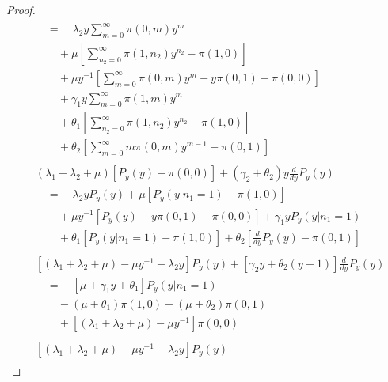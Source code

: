 \begin{proof}
\begin{align}
\begin{split}
            & \quad = \quad \lambda_2 y \sum_{m=0}^{\infty} \pi(0, m) y^{m} \\
            & \quad \quad + \mu \left[ \sum_{n_2=0}^{\infty} \pi(1, n_2) y^{n_2} - \pi(1, 0) \right] \\
            & \quad \quad + \mu y^{-1} \left[ \sum_{m=0}^{\infty} \pi(0, m) y^{m} - y \pi(0, 1) - \pi(0, 0) \right] \\
            & \quad \quad + \gamma_1 y \sum_{m=0}^{\infty} \pi(1, m) y^{m} \\
            & \quad \quad + \theta_1 \left[ \sum_{n_2=0}^{\infty} \pi(1, n_2) y^{n_2} - \pi(1, 0) \right] \\
            & \quad \quad + \theta_2 \left[ \sum_{m=0}^{\infty} m \pi(0, m) y^{m-1} - \pi(0, 1) \right]
        \end{split} \nonumber \\
        \begin{split}
            & (\lambda_1 + \lambda_2 + \mu) \left[ P_y(y) - \pi(0, 0) \right]
            + (\gamma_2 + \theta_2) y \frac{d}{dy} P_y(y) \\
            & \quad = \quad \lambda_2 y P_y(y)
            + \mu \left[ P_y(y | n_1=1) - \pi(1, 0) \right] \\
            & \quad \quad + \mu y^{-1} \left[ P_y(y) - y \pi(0, 1) - \pi(0, 0) \right]
            + \gamma_1 y P_y(y | n_1=1) \\
            & \quad \quad + \theta_1 \left[ P_y(y | n_1=1) - \pi(1, 0) \right]
            + \theta_2 \left[ \frac{d}{dy} P_y(y) - \pi(0, 1) \right]
        \end{split} \nonumber \\
        \begin{split}
            & \left[ (\lambda_1 + \lambda_2 + \mu) - \mu y^{-1} - \lambda_2 y \right] P_y(y)
            + \left[ \gamma_2 y + \theta_2(y-1) \right] \frac{d}{dy} P_y(y) \\
            & \quad = \quad \left[ \mu + \gamma_1 y + \theta_1 \right] P_y(y | n_1=1) \\
            & \quad \quad - (\mu + \theta_1) \pi(1, 0)
            - (\mu + \theta_2) \pi(0, 1) \\
            & \quad \quad + \left[ (\lambda_1 + \lambda_2 + \mu) - \mu y^{-1} \right] \pi(0, 0)
        \end{split} \nonumber \\
        \begin{split}
            & \left[ (\lambda_1 + \lambda_2 + \mu) - \mu y^{-1} - \lambda_2 y \right] P_y(y)

\end{split}
\end{align}
\end{proof}
